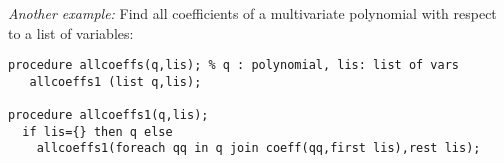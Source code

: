 {\it Another example:} Find all coefficients of a multivariate
polynomial with respect to a list of variables:

\begin{verbatim}
procedure allcoeffs(q,lis); % q : polynomial, lis: list of vars
   allcoeffs1 (list q,lis);

procedure allcoeffs1(q,lis);
  if lis={} then q else
    allcoeffs1(foreach qq in q join coeff(qq,first lis),rest lis);

\end{verbatim}

